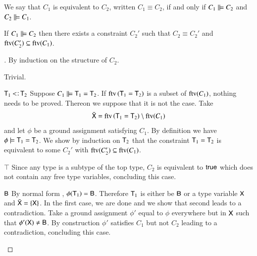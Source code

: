 \documentclass{report}
\begin{document}
  \begin{dfn}
    We say that $C_1$ is equivalent to $C_2$, written $C_1\equiv C_2$, if and
    only if $C_1\mathrel|\models C_2$ and $C_2\mathrel|\models C_1$.
  \end{dfn}
  \begin{thm}
    If $C_1\mathrel|\models C_2$ then there exists a constraint $C_2'$ such that
    $C_2\equiv C_2'$ and $\mathop{\rm ftv}\nolimits(C_2')\subseteq\mathop{\rm ftv}\nolimits(C_1)$.
  \end{thm}
  \begin{proof}[]
    By induction on the structure of $C_2$.
    \begin{indcase}{\True}
      Trivial.
    \end{indcase}
    \begin{indcase}{$\type{T}_1\subtype\type{T}_2$}
      Suppose $C_1\mathrel|\models \textsf{T}_1=\textsf{T}_2$. If $\mathop{\rm ftv}\nolimits\left({\textsf{T}_1=\textsf{T}_2}\right)$
      is a subset of $\mathop{\rm ftv}\nolimits(C_1)$, nothing needs to be proved. Thereon we suppose that it
      is not the case. Take
      \begin{displaymath}
        \bar{\textsf{X}}=\mathop{\rm ftv}\nolimits\left({\textsf{T}_1=\textsf{T}_2}\right)\setminus\mathop{\rm ftv}\nolimits(C_1)
      \end{displaymath}
      and let $\phi$ be a ground assignment satisfying $C_1$. By definition  we
      have $\phi\models \textsf{T}_1=\textsf{T}_2$\textrm{.}
      We show by induction on $\textsf{T}_2$ that the constraint
      $\textsf{T}_1=\textsf{T}_2$ is equivalent to some $C_2'$ with $\mathop{\rm ftv}\nolimits(C_2')\subseteq\mathop{\rm ftv}\nolimits(C_1)$.
      \begin{innerindcase}{$\top$}
        Since any type is a subtype of the top type, $C_2$ is equivalent to $\textsf{true}$ which does
        not contain any free type variables, concluding this case.
      \end{innerindcase}
      \begin{innerindcase}{$\textsf{B}$}
        By normal form , $\phi(\textsf{T}_1)=\textsf{B}$. Therefore
        $\textsf{T}_1$ is either be $\textsf{B}$ or a type variable $\textsf{X}$ and $\bar{\textsf{X}}=\left\{\textsf{X}\right\}$.
        In the first case, we are done and we show that second leads to a contradiction.
        Take a ground assignment $\phi'$ equal to $\phi$ everywhere but in $\textsf{X}$ such that
        $\phi'(\textsf{X})\neq\textsf{B}$. By construction $\phi'$ satisfies $C_1$ but not $C_2$ leading to
        a contradiction, concluding this case.
      \end{innerindcase}

\end{indcase}
\end{proof}
\end{document}
